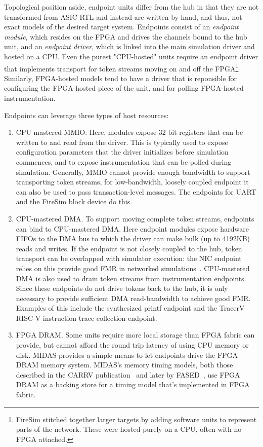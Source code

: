 Topological position aside, endpoint units differ from the hub in that they are not transformed from ASIC
RTL and instead are written by hand, and thus, not exact models of the desired target system.
Endpoints consist of an \emph{endpoint module}, which resides on the FPGA and drives the channels bound to the hub unit, and an
\emph{endpoint driver}, which is linked into the main simulation driver and hosted on a CPU.
Even the purest "CPU-hosted" units require an endpoint driver that
implements transport for token streams moving on and off the
FPGA\footnote{FireSim stitched together larger targets by adding software units
to represent parts of the network. These were hosted purely on a CPU, often
with no FPGA attached.} Similarly, FPGA-hosted models tend to have a driver
that is reponsible for configuring the FPGA-hosted piece of the unit, and for
polling FPGA-hosted instrumentation.

Endpoints can leverage three types of host resources:

\begin{enumerate}
\item CPU-mastered MMIO. Here, modules expose 32-bit registers that can be
    written to and read from the driver. This is typically used to expose
    configuration  parameters that the driver initializes before simulation
    commences, and to expose instrumentation that can be polled during
    simulation. Generally, MMIO cannot provide enough bandwidth to support transporting token streams,
    for low-bandwidth, loosely coupled endpoint it can also be used to pass transaction-level messages.
    The endpoints for UART and the FireSim block device do this.

\item CPU-mastered DMA. To support moving complete token streams, endpoints can
    bind to CPU-mastered DMA. Here endpoint modules expose hardware FIFOs to the DMA bus to which the driver
    can make bulk (up to 4192KB) reads and writes. If the endpoint is not closely coupled
    to the hub, token transport can be overlapped with simulator execution: the NIC endpoint relies on this
    provide good FMR in networked simulations~\cite{FireSim}. CPU-mastered DMA is also used 
    to drain token streams from instrumentation endpoints. Since these endpoints do not drive
    tokens back to the hub, it is only necessary to provide sufficient DMA read-bandwidth to achieve good FMR.
    Examples of this include the synthesized printf endpoint and the TracerV
    RISC-V instruction trace collection endpoint.

\item FPGA DRAM. Some units require more local storage than FPGA fabric can
    provide, but cannot afford the round trip latency of using CPU memory or
    disk. MIDAS provides a simple means to let endpoints drive the FPGA
    DRAM memory system.  MIDAS's memory timing models, both those described
    in the CARRV publication~\cite{Midas} and later by FASED~\cite{FASED},
    use FPGA DRAM as a backing store for a timing model that's implemented
    in FPGA fabric.
\end{enumerate}

